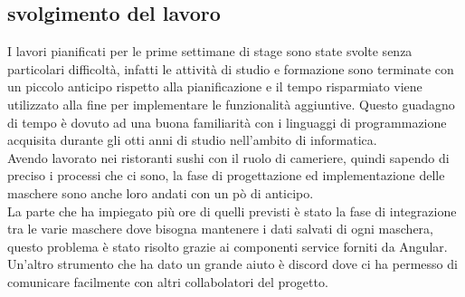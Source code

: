 \subsection{svolgimento del lavoro}
I lavori pianificati per le prime settimane di stage sono state svolte senza particolari difficoltà, infatti le attività di studio e formazione sono terminate con un piccolo anticipo rispetto alla pianificazione e il tempo risparmiato viene utilizzato alla fine per implementare le funzionalità aggiuntive. Questo guadagno di tempo è dovuto ad una buona familiarità con i linguaggi di programmazione acquisita durante gli otti anni di studio nell'ambito di informatica.\\
Avendo lavorato nei ristoranti sushi con il ruolo di cameriere, quindi sapendo di preciso i processi che ci sono, la fase di  progettazione ed implementazione delle maschere sono anche loro andati con un pò di anticipo.\\
La parte che ha impiegato più ore di quelli previsti è stato la fase di integrazione tra le varie maschere dove bisogna mantenere i dati salvati di ogni maschera, questo problema è stato risolto grazie ai componenti service forniti da Angular. Un'altro strumento che ha dato un grande aiuto è discord dove ci ha permesso di comunicare facilmente con altri collabolatori del progetto.\\


